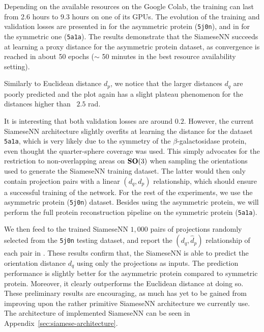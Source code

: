 Depending on the available resources on the Google Colab, the training can last from 2.6 hours to 9.3 hours on one of its GPUs.
The evolution of the training and validation losses are presented in  for the asymmetric protein (\texttt{5j0n}), and in  for the symmetric one (\texttt{5a1a}).
The results demonstrate that the SiameseNN succeeds at learning a proxy distance for the asymmetric protein dataset, as convergence is reached in about 50 epochs ($\sim$ 50 minutes in the best resource availability setting).

Similarly to Euclidean distance $d_p$, we notice that the larger distances $d_q$ are poorly predicted and the plot again has a slight plateau phenomenon for the distances higher than ~$2.5$ rad.

It is interesting that both validation losses are around $0.2$.
However, the current SiameseNN architecture slightly overfits at learning the distance for the dataset \texttt{5a1a}, which is very likely due to the symmetry of the $\beta$-galactosidase protein, even thought the quarter-sphere coverage was used.
This simply advocates for the restriction to non-overlapping areas on $\mathrm{\mathbf{SO}}(3)$ when sampling the orientations used to generate the SiameseNN training dataset.
The latter would then only contain projection pairs with a linear $(d_q,d_p)$ relationship, which should ensure a successful training of the network.
For the rest of the experiments, we use the asymmetric protein (\texttt{5j0n}) dataset.
Besides using the asymmetric protein, we will perform the full protein reconstruction pipeline on the symmetric protein (\texttt{5a1a}).

We then feed to the trained SiameseNN $1,000$ pairs of projections randomly selected from the \texttt{5j0n} testing dataset, and report the $(d_q,\widehat{d}_p)$ relationship of each pair in .
These results confirm that, the SiameseNN is able to predict the orientation distance $d_q$ using only the projections as inputs. The prediction performance is slightly better for the asymmetric protein compared to symmetric protein.
Moreover, it clearly outperforms the Euclidean distance at doing so.
These preliminary results are encouraging, as much has yet to be gained from improving upon the rather primitive SiameseNN architecture we currently use. The architecture of implemented SiameseNN can be seen in Appendix~\ref{sec:siamese-architecture}.

